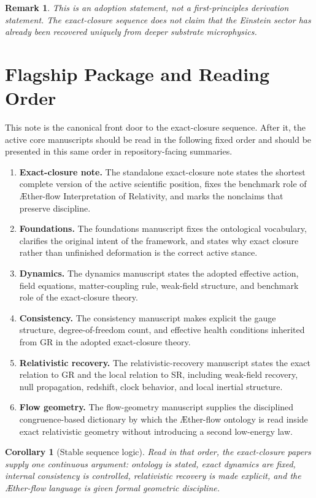 \documentclass[11pt]{article}
\newcommand{\Aflow}{\AE{}ther-flow}
\newcommand{\TheoryName}{\Aflow{} Interpretation of Relativity}
\newtheorem{remark}{Remark}
\newtheorem{corollary}{Corollary}
\begin{document}
\begin{remark}
This is an adoption statement, not a first-principles derivation statement. The exact-closure sequence does not claim that the Einstein sector has already been recovered uniquely from deeper substrate microphysics.
\end{remark}

\section{Flagship Package and Reading Order}

This note is the canonical front door to the exact-closure sequence. After it, the active core manuscripts should be read in the following fixed order and should be presented in this same order in repository-facing summaries.
\begin{enumerate}
    \item \textbf{Exact-closure note.} The standalone exact-closure note states the shortest complete version of the active scientific position, fixes the benchmark role of \TheoryName{}, and marks the nonclaims that preserve discipline.
    \item \textbf{Foundations.} The foundations manuscript fixes the ontological vocabulary, clarifies the original intent of the framework, and states why exact closure rather than unfinished deformation is the correct active stance.
    \item \textbf{Dynamics.} The dynamics manuscript states the adopted effective action, field equations, matter-coupling rule, weak-field structure, and benchmark role of the exact-closure theory.
    \item \textbf{Consistency.} The consistency manuscript makes explicit the gauge structure, degree-of-freedom count, and effective health conditions inherited from GR in the adopted exact-closure theory.
    \item \textbf{Relativistic recovery.} The relativistic-recovery manuscript states the exact relation to GR and the local relation to SR, including weak-field recovery, null propagation, redshift, clock behavior, and local inertial structure.
    \item \textbf{Flow geometry.} The flow-geometry manuscript supplies the disciplined congruence-based dictionary by which the \Aflow{} ontology is read inside exact relativistic geometry without introducing a second low-energy law.
\end{enumerate}

\begin{corollary}[Stable sequence logic]
Read in that order, the exact-closure papers supply one continuous argument: ontology is stated, exact dynamics are fixed, internal consistency is controlled, relativistic recovery is made explicit, and the \Aflow{} language is given formal geometric discipline.
\end{corollary}
\end{document}
